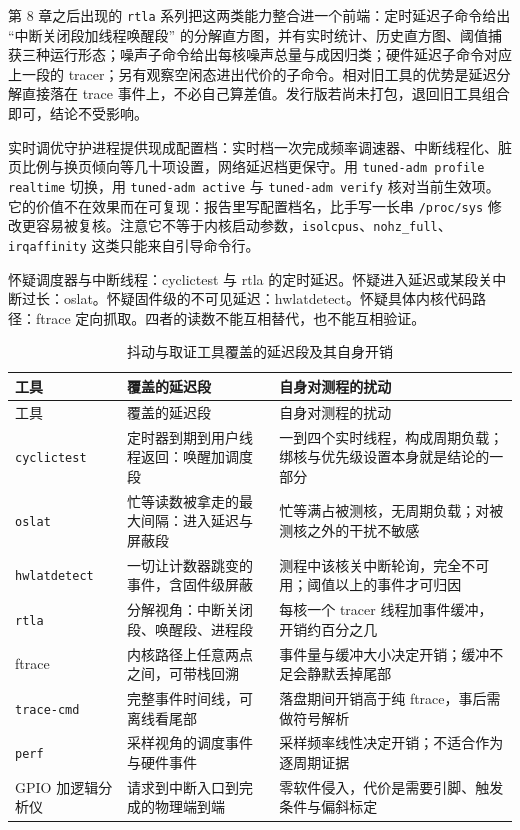 \documentclass[12pt,a4paper,fontset=fandol]{ctexbook}
\newcommand{\Tp}[1]{\texttt{#1}}
\begin{document}
第 8 章之后出现的 \Tp{rtla} 系列把这两类能力整合进一个前端：定时延迟子命令给出 ``中断关闭段加线程唤醒段'' 的分解直方图，并有实时统计、历史直方图、阈值捕获三种运行形态；噪声子命令给出每核噪声总量与成因归类；硬件延迟子命令对应上一段的 tracer；另有观察空闲态进出代价的子命令。相对旧工具的优势是延迟分解直接落在 trace 事件上，不必自己算差值。发行版若尚未打包，退回旧工具组合即可，结论不受影响。

实时调优守护进程提供现成配置档：实时档一次完成频率调速器、中断线程化、脏页比例与换页倾向等几十项设置，网络延迟档更保守。用 \Tp{tuned-adm profile realtime} 切换，用 \Tp{tuned-adm active} 与 \Tp{tuned-adm verify} 核对当前生效项。它的价值不在效果而在可复现：报告里写配置档名，比手写一长串 \Tp{/proc/sys} 修改更容易被复核。注意它不等于内核启动参数，\Tp{isolcpus}、\Tp{nohz\_full}、\Tp{irqaffinity} 这类只能来自引导命令行。

\begin{note}[title={工具选择取决于你怀疑哪一段}]
怀疑调度器与中断线程：cyclictest 与 rtla 的定时延迟。怀疑进入延迟或某段关中断过长：oslat。怀疑固件级的不可见延迟：hwlatdetect。怀疑具体内核代码路径：ftrace 定向抓取。四者的读数不能互相替代，也不能互相验证。
\end{note}

\begin{longtable}{>{\raggedright\arraybackslash}p{} >{\raggedright\arraybackslash}p{} >{\raggedright\arraybackslash}p{}}
\caption{抖动与取证工具覆盖的延迟段及其自身开销}\label{tab:ch11-tool-coverage}\\
\toprule
工具 & 覆盖的延迟段 & 自身对测程的扰动 \\
\midrule
\endfirsthead
\toprule
工具 & 覆盖的延迟段 & 自身对测程的扰动 \\
\midrule
\endhead
\bottomrule
\endfoot
\endlastfoot
\Tp{cyclictest} & 定时器到期到用户线程返回：唤醒加调度段 & 一到四个实时线程，构成周期负载；绑核与优先级设置本身就是结论的一部分 \\
\Tp{oslat} & 忙等读数被拿走的最大间隔：进入延迟与屏蔽段 & 忙等满占被测核，无周期负载；对被测核之外的干扰不敏感 \\
\Tp{hwlatdetect} & 一切让计数器跳变的事件，含固件级屏蔽 & 测程中该核关中断轮询，完全不可用；阈值以上的事件才可归因 \\
\Tp{rtla} & 分解视角：中断关闭段、唤醒段、进程段 & 每核一个 tracer 线程加事件缓冲，开销约百分之几 \\
ftrace & 内核路径上任意两点之间，可带栈回溯 & 事件量与缓冲大小决定开销；缓冲不足会静默丢掉尾部 \\
\Tp{trace-cmd} & 完整事件时间线，可离线看尾部 & 落盘期间开销高于纯 ftrace，事后需做符号解析 \\
\Tp{perf} & 采样视角的调度事件与硬件事件 & 采样频率线性决定开销；不适合作为逐周期证据 \\
GPIO 加逻辑分析仪 & 请求到中断入口到完成的物理端到端 & 零软件侵入，代价是需要引脚、触发条件与偏斜标定 \\
\end{longtable}
\end{document}
